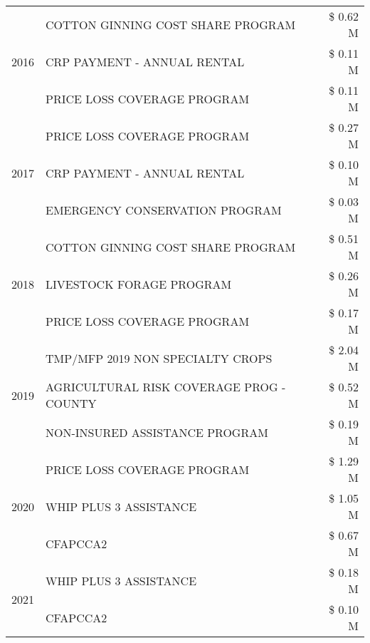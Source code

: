 \begin{tabular}{llr}
\cline{1-3}
\multirow[t]{3}{*}{2016} & COTTON GINNING COST SHARE PROGRAM & \$ 0.62 M \\
 & CRP PAYMENT - ANNUAL RENTAL & \$ 0.11 M \\
 & PRICE LOSS COVERAGE PROGRAM & \$ 0.11 M \\
\cline{1-3}
\multirow[t]{3}{*}{2017} & PRICE LOSS COVERAGE PROGRAM & \$ 0.27 M \\
 & CRP PAYMENT - ANNUAL RENTAL & \$ 0.10 M \\
 & EMERGENCY CONSERVATION PROGRAM & \$ 0.03 M \\
\cline{1-3}
\multirow[t]{3}{*}{2018} & COTTON GINNING COST SHARE PROGRAM & \$ 0.51 M \\
 & LIVESTOCK FORAGE PROGRAM & \$ 0.26 M \\
 & PRICE LOSS COVERAGE PROGRAM & \$ 0.17 M \\
\cline{1-3}
\multirow[t]{3}{*}{2019} & TMP/MFP 2019 NON SPECIALTY CROPS & \$ 2.04 M \\
 & AGRICULTURAL RISK COVERAGE PROG - COUNTY & \$ 0.52 M \\
 & NON-INSURED ASSISTANCE PROGRAM & \$ 0.19 M \\
\cline{1-3}
\multirow[t]{3}{*}{2020} & PRICE LOSS COVERAGE PROGRAM & \$ 1.29 M \\
 & WHIP PLUS 3 ASSISTANCE & \$ 1.05 M \\
 & CFAPCCA2 & \$ 0.67 M \\
\cline{1-3}
\multirow[t]{2}{*}{2021} & WHIP PLUS 3 ASSISTANCE & \$ 0.18 M \\
 & CFAPCCA2 & \$ 0.10 M \\
\cline{1-3}
\bottomrule
\end{tabular}
